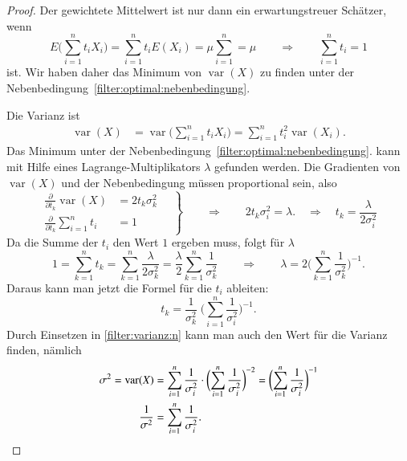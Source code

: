 \begin{proof}
Der gewichtete Mittelwert ist nur dann ein erwartungstreuer Schätzer, wenn
\begin{equation}
E\biggl(\sum_{i=1}^n t_iX_i\biggr)
=
\sum_{i=1}^n t_iE(X_i)=\mu\sum_{i=1}^n = \mu
\qquad\Rightarrow\qquad
\sum_{i=1}^n t_i = 1
\label{filter:optimal:nebenbedingung}
\end{equation}
ist.
Wir haben daher das Minimum von $\operatorname{var}(X)$ zu finden unter
der Nebenbedingung~\eqref{filter:optimal:nebenbedingung}.

Die Varianz ist
\begin{align}
\operatorname{var}(X)
&=
\operatorname{var}\biggl(
\sum_{i=1}^n t_iX_i
\biggr)
=
\sum_{i=1}^n t_i^2 \operatorname{var}(X_i).
\label{filter:varianz:n}
\end{align}
Das Minimum unter der Nebenbedingung~\eqref{filter:optimal:nebenbedingung}.
kann mit Hilfe eines Lagrange-Multiplikators $\lambda$ gefunden werden.
Die Gradienten von $\operatorname{var}(X)$ und der Nebenbedingung müssen
proportional sein, also
\begin{equation}
\left.
\begin{aligned}
\frac{\partial}{\partial t_k} \operatorname{var}(X)
&= 2t_k \sigma_k^2
\\
\frac{\partial}{\partial t_k}\sum_{i=1}^nt_i&=1
\end{aligned}
\quad
\right\}
\qquad
\Rightarrow
\qquad
2t_k \sigma_i^2 =\lambda.
\quad
\Rightarrow
\quad
t_k = \frac{\lambda}{2\sigma_i^2}
\end{equation}
Da die Summe der $t_i$ den Wert $1$ ergeben muss, folgt für $\lambda$
\[
1
=
\sum_{k=1}^n t_k
=
\sum_{k=1}^n \frac{\lambda}{2\sigma_k^2}
=
\frac{\lambda}{2}\sum_{k=1}^{n} \frac{1}{\sigma_k^2}
\qquad\Rightarrow\qquad
\lambda = 2\biggl(
\sum_{k=1}^{n} \frac{1}{\sigma_k^2}
\biggr)^{-1}.
\]
Daraus kann man jetzt die Formel für die $t_i$ ableiten:
\[
t_k
=
\frac{1}{\sigma_k^2} \;\biggl(\sum_{i=1}^n \frac{1}{\sigma_i^2}\biggr)^{-1}.
\]
Durch Einsetzen in \eqref{filter:varianz:n} kann man auch den Wert für
die Varianz finden, nämlich
\begin{align*}
\sigma^2
=
\operatorname{var}(X)
&=
\sum_{i=1}^n \frac{1}{\sigma_i^2}
\cdot
\biggl(\sum_{i=1}^n \frac{1}{\sigma_i^2}\biggr)^{-2}
=
\biggl(\sum_{i=1}^n \frac{1}{\sigma_i^2}\biggr)^{-1}
\\
\frac{1}{\sigma^2}
&=
\sum_{i=1}^n \frac{1}{\sigma_i^2}.
\qedhere
\end{align*}
\end{proof}
